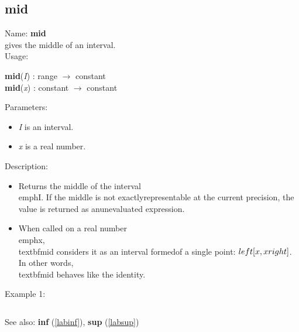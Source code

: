 \subsection{mid}
\label{labmid}
\noindent Name: \textbf{mid}\\
gives the middle of an interval.\\
\noindent Usage: 
\begin{center}
\textbf{mid}(\emph{I}) : \textsf{range} $\rightarrow$ \textsf{constant}\\
\textbf{mid}(\emph{x}) : \textsf{constant} $\rightarrow$ \textsf{constant}\\
\end{center}
Parameters: 
\begin{itemize}
\item \emph{I} is an interval.
\item \emph{x} is a real number.
\end{itemize}
\noindent Description: \begin{itemize}

\item Returns the middle of the interval \\emph{I}. If the middle is not exactly\n   representable at the current precision, the value is returned as an\n   unevaluated expression.\n
\item When called on a real number \\emph{x}, \\textbf{mid} considers it as an interval formed\n   of a single point: $\\left[ x, x\\right]$. In other words, \\textbf{mid} behaves like the identity.\n\end{itemize}
\noindent Example 1: 
\begin{center}\begin{minipage}{15cm}\begin{Verbatim}[frame=single]
\end{Verbatim}
\end{minipage}\end{center}
See also: \textbf{inf} (\ref{labinf}), \textbf{sup} (\ref{labsup})
